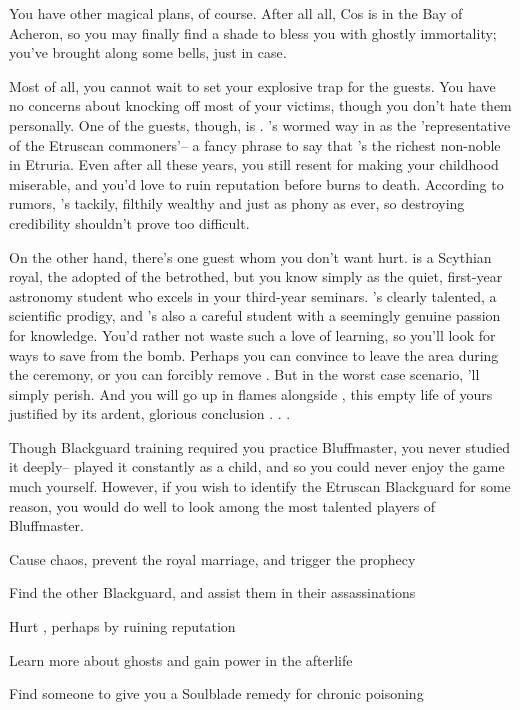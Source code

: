 \documentclass[char]{Kos}
\begin{document}
You have other magical plans, of course. After all all, Cos is in the Bay of Acheron, so you may finally find a shade to bless you with ghostly immortality; you've brought along some bells, just in case. 

Most of all, you cannot wait to set your explosive trap for the guests. You have no concerns about knocking off most of your victims, though you don't hate them personally. One of the guests, though, is \cMerchant{}. \cMerchant{\They}'s wormed \cMerchant{\their} way in as the 'representative of the Etruscan commoners'-- a fancy phrase to say that \cMerchant{\they}'s the richest non-noble in Etruria. Even after all these years, you still resent \cMerchant{\them} for making your childhood miserable, and you'd love to ruin \cMerchant{\their} reputation before \cMerchant{\they} burns to death. According to rumors, \cMerchant{\they}'s tackily, filthily wealthy and just as phony as ever, so destroying \cMerchant{\their} credibility shouldn't prove too difficult.

On the other hand, there's one guest whom you don't want hurt. \cWard{} is a Scythian royal, the adopted \cWard{\sibling} of the betrothed, but you know \cWard{\them} simply as the quiet, first-year astronomy student who excels in your third-year seminars. \cWard{\They}'s clearly talented, a scientific prodigy, and \cWard{\they}'s also a careful student with a seemingly genuine passion for knowledge. You'd rather not waste such a love of learning, so you'll look for ways to save \cWard{\them} from the bomb. Perhaps you can convince \cWard{\them} to leave the area during the ceremony, or you can forcibly remove \cWard{\them}. But in the worst case scenario, \cWard{\they}'ll simply perish. And you will go up in flames alongside \cWard{\them}, this empty life of yours justified by its ardent, glorious conclusion . . .

\begin{itemz}[Notes]
  \item Though Blackguard training required you practice Bluffmaster, you never studied it deeply--\cMerchant{} played it constantly as a child, and so you could never enjoy the game much yourself. However, if you wish to identify the Etruscan Blackguard for some reason, you would do well to look among the most talented players of Bluffmaster.
\end{itemz}

\begin{itemz}[Goals]
\item Cause chaos, prevent the royal marriage, and trigger the prophecy
\item Find the other Blackguard, and assist them in their assassinations
\item Hurt \cMerchant{}, perhaps by ruining \cMerchant{\their} reputation
\item Learn more about ghosts and gain power in the afterlife
\item Find someone to give you a Soulblade remedy for chronic poisoning
\end{itemz}
\end{document}
